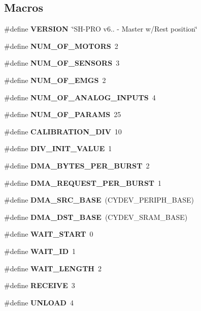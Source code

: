 \subsection*{Macros}
\begin{DoxyCompactItemize}
\item 
\mbox{\label{globals_8h_a1c6d5de492ac61ad29aec7aa9a436bbf}} 
\#define {\bfseries V\+E\+R\+S\+I\+ON}~\char`\"{}SH-\/P\+RO v6.. -\/ Master w/Rest position\char`\"{}
\item 
\#define \textbf{ N\+U\+M\+\_\+\+O\+F\+\_\+\+M\+O\+T\+O\+RS}~2
\item 
\#define \textbf{ N\+U\+M\+\_\+\+O\+F\+\_\+\+S\+E\+N\+S\+O\+RS}~3
\item 
\#define \textbf{ N\+U\+M\+\_\+\+O\+F\+\_\+\+E\+M\+GS}~2
\item 
\#define \textbf{ N\+U\+M\+\_\+\+O\+F\+\_\+\+A\+N\+A\+L\+O\+G\+\_\+\+I\+N\+P\+U\+TS}~4
\item 
\#define \textbf{ N\+U\+M\+\_\+\+O\+F\+\_\+\+P\+A\+R\+A\+MS}~25
\item 
\#define \textbf{ C\+A\+L\+I\+B\+R\+A\+T\+I\+O\+N\+\_\+\+D\+IV}~10
\item 
\mbox{\label{globals_8h_a14df76a41da04070ee775565e8d67e81}} 
\#define {\bfseries D\+I\+V\+\_\+\+I\+N\+I\+T\+\_\+\+V\+A\+L\+UE}~1
\item 
\mbox{\label{globals_8h_abf6c9afec04b86961e177e0646401ace}} 
\#define {\bfseries D\+M\+A\+\_\+\+B\+Y\+T\+E\+S\+\_\+\+P\+E\+R\+\_\+\+B\+U\+R\+ST}~2
\item 
\mbox{\label{globals_8h_ab4613f8bee68bc68fa6fe94a3ae6d568}} 
\#define {\bfseries D\+M\+A\+\_\+\+R\+E\+Q\+U\+E\+S\+T\+\_\+\+P\+E\+R\+\_\+\+B\+U\+R\+ST}~1
\item 
\mbox{\label{globals_8h_a3cc2eedb40809a1f15ad841c8abbcebf}} 
\#define {\bfseries D\+M\+A\+\_\+\+S\+R\+C\+\_\+\+B\+A\+SE}~(C\+Y\+D\+E\+V\+\_\+\+P\+E\+R\+I\+P\+H\+\_\+\+B\+A\+SE)
\item 
\mbox{\label{globals_8h_aa54e301f446a66cbf8c943d920c8e967}} 
\#define {\bfseries D\+M\+A\+\_\+\+D\+S\+T\+\_\+\+B\+A\+SE}~(C\+Y\+D\+E\+V\+\_\+\+S\+R\+A\+M\+\_\+\+B\+A\+SE)
\item 
\#define \textbf{ W\+A\+I\+T\+\_\+\+S\+T\+A\+RT}~0
\item 
\#define \textbf{ W\+A\+I\+T\+\_\+\+ID}~1
\item 
\#define \textbf{ W\+A\+I\+T\+\_\+\+L\+E\+N\+G\+TH}~2
\item 
\#define \textbf{ R\+E\+C\+E\+I\+VE}~3
\item 
\#define \textbf{ U\+N\+L\+O\+AD}~4

\end{DoxyCompactItemize}
